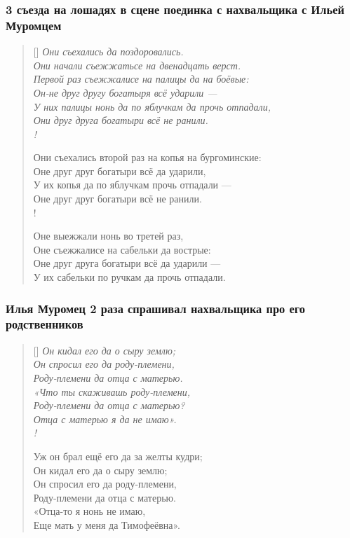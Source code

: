 \documentclass[a4paper, 12pt]{article}
\begin{document}
\subsubsection{3 съезда на лошадях в сцене поединка с нахвальщика с Ильей Муромцем}
\begin{verse}[\versewidth]
\itshape
Они съехались да поздоровались.\\
Они начали съежжатьсе на двенадцать верст.\\
Первой раз съежжалисе на палицы да на боёвые:\\
Он-не друг другу богатыря всё ударили —\\
У них палицы нонь да по яблучкам да прочь отпадали,\\
Они друг друга богатыри всё не ранили.\\!

Они съехались второй раз на копья на бургоминские:\\
Оне друг друг богатыри всё да ударили,\\
У их копья да по яблучкам прочь отпадали —\\
Оне друг друг богатыри всё не ранили.\\!

Оне выежжали нонь во третей раз,\\
Оне съежжалисе на сабельки да вострые:\\
Оне друг друга богатыри всё да ударили —\\
У их сабельки по ручкам да прочь отпадали.
\end{verse}


\subsubsection{Илья Муромец 2 раза спрашивал нахвальщика про его родственников}
\begin{verse}[\versewidth]
\itshape
Он кидал его да о сыру землю;\\
Он спросил его да роду-племени,\\
Роду-племени да отца с матерью.\\
«Что ты скаживашь роду-племени,\\
Роду-племени да отца с матерью?\\
Отца с матерью я да не имаю».\\!

Уж он брал ещё его да за желты кудри;\\
Он кидал его да о сыру землю;\\
Он спросил его да роду-племени,\\
Роду-племени да отца с матерью.\\
«Отца-то я нонь не имаю,\\
Еще мать у меня да Тимофеёвна».
\end{verse}
\end{document}
